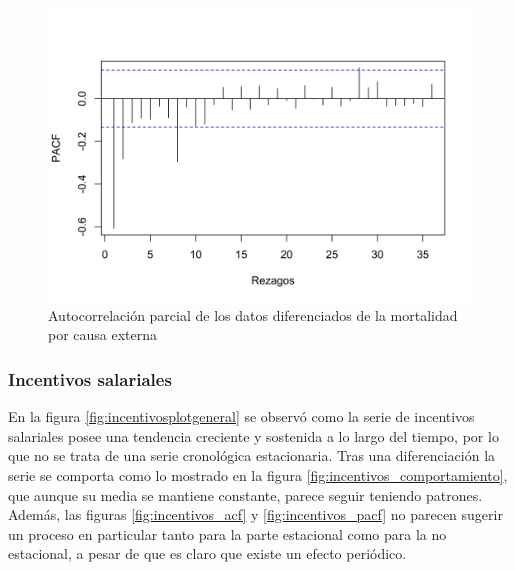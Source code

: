 \documentclass[
]{article}
\begin{document}
\begin{figure}[H]
\includegraphics[width=1\linewidth,height=1\textheight]{Tesis_files/figure-latex/externa_pacf-1} \caption{Autocorrelación parcial de los datos diferenciados de la mortalidad por causa externa}\label{fig:externa_pacf}
\end{figure}

\subsubsection{Incentivos salariales}

En la figura \ref{fig:incentivosplotgeneral} se observó como la serie de
incentivos salariales posee una tendencia creciente y sostenida a lo
largo del tiempo, por lo que no se trata de una serie cronológica
estacionaria. Tras una diferenciación la serie se comporta como lo
mostrado en la figura \ref{fig:incentivos_comportamiento}, que aunque su
media se mantiene constante, parece seguir teniendo patrones. Además,
las figuras \ref{fig:incentivos_acf} y \ref{fig:incentivos_pacf} no
parecen sugerir un proceso en particular tanto para la parte estacional
como para la no estacional, a pesar de que es claro que existe un efecto
periódico.
\end{document}

